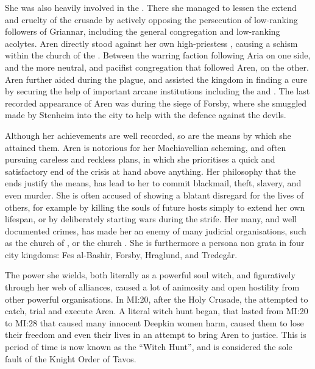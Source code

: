 She was also heavily involved in the . There she
managed to lessen the extend and cruelty of the crusade by actively opposing
the persecution of low-ranking followers of Griannar, including the general
congregation and low-ranking acolytes. Aren directly stood against her own
high-priestess , causing a schism within the church of the
. Between the warring faction following Aria on one
side, and the more neutral, and pacifist congregation that followed Aren, on
the other. Aren further aided  during the plague, and
assisted the kingdom in finding a cure by securing the help of important
arcane institutions including the  and
. The last recorded appearance of Aren was
during the siege of Forsby, where she smuggled 
made by Stenheim into the city to help with the defence against the devils.

Although her achievements are well recorded, so are the means by which she
attained them. Aren is notorious for her Machiavellian scheming, and often
pursuing careless and reckless plans, in which she prioritises a quick and
satisfactory end of the crisis at hand above anything. Her philosophy that the
ends justify the means, has lead to her to commit blackmail, theft, slavery,
and even murder. She is often accused of showing a blatant disregard for the
lives of others, for example by killing the souls of future hosts simply to
extend her own lifespan, or by deliberately starting wars during the
strife. Her many, and well documented crimes, has made her an enemy of many
judicial organisations, such as the church of , or the church
. She is furthermore a persona non grata in four city
kingdoms: Fes al-Bashir, Forsby, Hraglund, and Tredegår.

\label{sec:Witch Hunt}
The power she wields, both literally as a powerful soul witch, and
figuratively through her web of alliances, caused a lot of animosity and open
hostility from other powerful organisations. In MI:20, after the Holy Crusade,
the  attempted to catch, trial and execute
Aren. A literal witch hunt began, that lasted from MI:20 to MI:28 that caused
many innocent Deepkin women harm, caused them to lose their freedom and even
their lives in an attempt to bring Aren to justice. This is period of time is
now known as the ``Witch Hunt'', and is considered the sole fault of the Knight
Order of Tavos.

